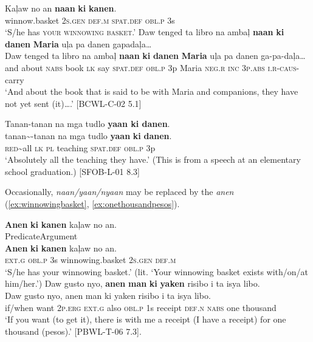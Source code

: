 \gll Kaļaw  no  an  \textbf{naan}  \textbf{ki}  \textbf{kanen}. \\
winnow.basket  2\textsc{s.gen}  \textsc{def.m}  \textsc{spat.def}  \textsc{obl.p}  3s \\
\glt ‘S/he has \textsc{your winnowing basket}.’
\z
\ea
Daw tenged ta libro na ambaļ \textbf{naan} \textbf{ki} \textbf{danen} \textbf{Maria} uļa pa danen gapadaļa… \\\smallskip \gll Daw  tenged  ta  libro  na  ambaļ  \textbf{naan}  \textbf{ki}  \textbf{danen}  \textbf{Maria}  uļa  pa  danen ga-pa-daļa… \\
and  about  \textsc{nabs}  book  \textsc{lk}  say  \textsc{spat.def}  \textsc{obl.p}  3p  Maria  \textsc{neg.r}  \textsc{inc}  3\textsc{p.abs}
\textsc{i.r}-\textsc{caus}-carry \\
\glt ‘And about the book that is said to be with Maria and companions, they have not yet sent (it)….’ [BCWL-C-02 5.1]
\z

\newpage
\ea
\label{ex:elementaryschool}
Tanan-tanan na mga tudlo \textbf{yaan ki danen}. \\\smallskip \gll tanan\sim{}-tanan	na	mga	tudlo		\textbf{yaan}		\textbf{ki}
\textbf{danen}. \\
\textsc{red}\sim{}all		\textsc{lk}	\textsc{pl}	teaching	\textsc{spat.def}	\textsc{obl.p}	3p \\
\glt `Absolutely all the teaching they have.' (This is from a speech at an elementary school graduation.) [SFOB-L-01 8.3]
\z

Occasionally, \textit{naan/yaan/nyaan} may be replaced by the  \textit{anen} (\ref{ex:winnowingbasket}, \ref{ex:onethousandpesos}).
 
\ea
\label{ex:winnowingbasket}
\textbf{Anen}  \textbf{ki}  \textbf{kanen}  kaļaw  no  an. \\\smallskip
Predicate\hspace{1.7cm}Argument \\
\gll \textbf{Anen}  \textbf{ki}  \textbf{kanen}  kaļaw  no  an. \\
\textsc{ext.g}  \textsc{obl.p}  3s  winnowing.basket  2\textsc{s.gen}  \textsc{def.m} \\
\glt ‘S/he has your winnowing basket.’ (lit. ‘Your winnowing basket exists with/on/at him/her.’)
\z
\ea
\label{ex:onethousandpesos}
Daw gusto nyo, \textbf{anen} \textbf{man} \textbf{ki} \textbf{yaken} risibo i ta isya libo.  \\\smallskip \gll Daw  gusto  nyo,  anen  man  ki  yaken  risibo  i  ta  isya  libo.  \\
if/when  want  2\textsc{p.erg}  \textsc{ext.g}  also  \textsc{obl.p}  1s  receipt  \textsc{def.n}  \textsc{nabs}   one  thousand \\
\glt ‘If you want (to get it), there is with me a receipt (I have a receipt) for one thousand (pesos).’ [PBWL-T-06 7.3].
\z

